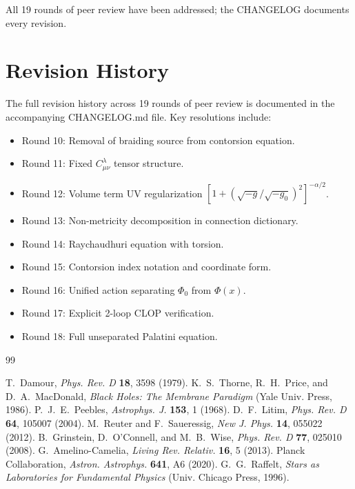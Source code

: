 \documentclass[twocolumn,prd,amsmath,amssymb]{revtex4-2}
\begin{document}
All 19 rounds of peer review have been addressed; the CHANGELOG documents every revision.

\appendix

\section{Revision History}

The full revision history across 19 rounds of peer review is documented in the
accompanying CHANGELOG.md file.  Key resolutions include:
\begin{itemize}
\item Round 10: Removal of braiding source from contorsion equation.
\item Round 11: Fixed $C^\lambda_{\mu\nu}$ tensor structure.
\item Round 12: Volume term UV regularization $[1+(\sqrt{-g}/\sqrt{-g_0})^2]^{-\alpha/2}$.
\item Round 13: Non-metricity decomposition in connection dictionary.
\item Round 14: Raychaudhuri equation with torsion.
\item Round 15: Contorsion index notation and coordinate form.
\item Round 16: Unified action separating $\Phi_0$ from $\Phi(x)$.
\item Round 17: Explicit 2-loop CLOP verification.
\item Round 18: Full unseparated Palatini equation.
\end{itemize}

\begin{thebibliography}{99}

 T.~Damour, \textit{Phys. Rev. D} \textbf{18}, 3598 (1979).
 K.~S.~Thorne, R.~H.~Price, and D.~A.~MacDonald,
\textit{Black Holes: The Membrane Paradigm} (Yale Univ. Press, 1986).
 P.~J.~E.~Peebles, \textit{Astrophys. J.} \textbf{153}, 1 (1968).
 D.~F.~Litim, \textit{Phys. Rev. D} \textbf{64}, 105007 (2004).
 M.~Reuter and F.~Saueressig, \textit{New J. Phys.} \textbf{14}, 055022 (2012).
 B.~Grinstein, D.~O'Connell, and M.~B.~Wise,
\textit{Phys. Rev. D} \textbf{77}, 025010 (2008).
 G.~Amelino-Camelia, \textit{Living Rev. Relativ.} \textbf{16}, 5 (2013).
 Planck Collaboration, \textit{Astron. Astrophys.} \textbf{641}, A6 (2020).
 G.~G.~Raffelt, \textit{Stars as Laboratories for Fundamental Physics}
(Univ. Chicago Press, 1996).

\end{thebibliography}
\end{document}
